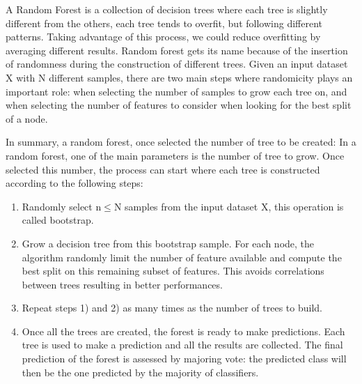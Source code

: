 \documentclass[11pt]{report}
\begin{document}
A Random Forest is a collection of decision trees where each tree is slightly different from the others, each tree tends to overfit, but following different patterns.
Taking advantage of this process, we could reduce overfitting by averaging different results.
Random forest gets its name because of the insertion of randomness during the construction of different trees.
Given an input dataset X with N different samples, there are two main steps where randomicity plays an important role: when selecting the number of samples to grow each tree on, and when selecting the number of features to consider when looking for the best split of a node.

In summary, a random forest, once selected the number of tree to be created:
In a random forest, one of the main parameters is the number of tree to grow.
Once selected this number, the process can start where each tree is constructed according to the following steps:
\begin{enumerate}
\item Randomly select n$\leq$N samples from the input dataset X, this operation is called bootstrap.
\item Grow a decision tree from this bootstrap sample. For each node, the algorithm randomly limit the number of feature available and compute the best split on this remaining subset of features. This avoids correlations between trees resulting in better performances.
\item Repeat steps 1) and 2) as many times as the number of trees to build.
\item Once all the trees are created, the forest is ready to make predictions. Each tree is used to make a prediction and all the results are collected.
The final prediction of the forest is assessed by majoring vote: the predicted class will then be the one predicted by the majority of classifiers.
\end{enumerate}


\end{document}
